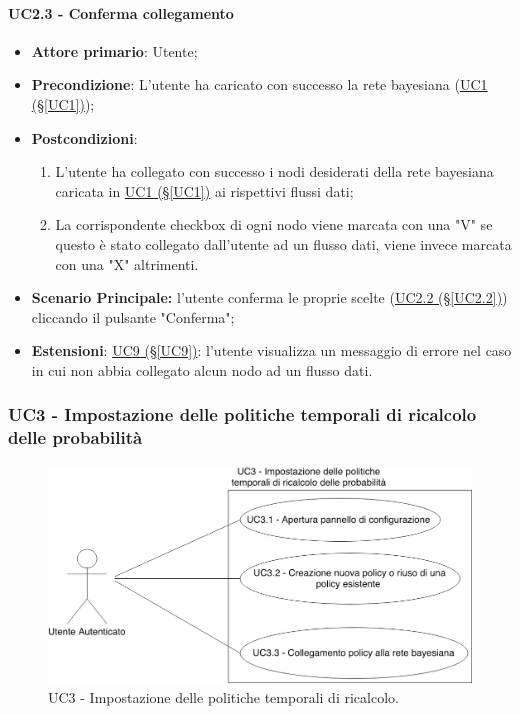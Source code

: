 \paragraph{UC2.3 - Conferma collegamento}\label{UC2.3}
\begin{itemize}
\item \textbf{Attore primario}: Utente;
\item \textbf{Precondizione}: L'utente ha caricato con successo la rete bayesiana (\hyperref[UC1]{UC1 (§\ref*{UC1})});
\item \textbf{Postcondizioni}: 
	\begin{enumerate}
	\item L'utente ha collegato con successo i nodi desiderati della rete bayesiana caricata in \hyperref[UC1]{UC1 				(§\ref*{UC1})} ai rispettivi flussi dati;
	\item La corrispondente checkbox di ogni nodo viene marcata con una "V" se questo è stato collegato dall'utente 				ad un flusso dati, viene invece marcata con una "X" altrimenti.
	\end{enumerate}
\item \textbf{Scenario Principale:} l'utente conferma le proprie scelte (\hyperref[UC2.2]{UC2.2 (§\ref*{UC2.2})}) cliccando il pulsante "Conferma";
\item \textbf{Estensioni}: \hyperref[UC9]{UC9 (§\ref*{UC9})}: l'utente visualizza un messaggio di errore nel caso in cui non abbia collegato alcun nodo ad un flusso dati.
\end{itemize}
\newpage

\subsubsection{UC3 - Impostazione delle politiche temporali di ricalcolo delle probabilità}\label{UC3}

\begin{figure}[H]
\centering
\includegraphics[scale=0.3]{./images/UC3.png}
\caption{UC3 - Impostazione delle politiche temporali di ricalcolo.}
\end{figure}

